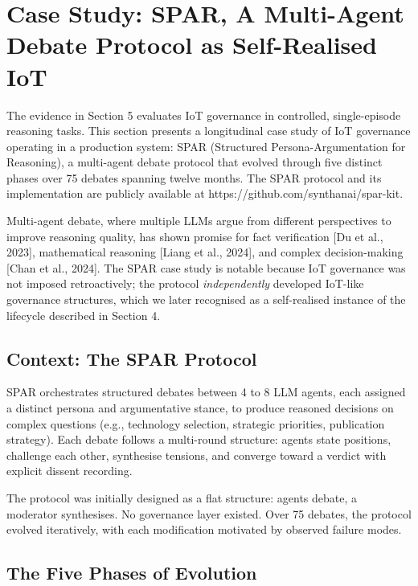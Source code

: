 \documentclass[11pt,a4paper]{article}
\begin{document}
\section{Case Study: SPAR, A Multi-Agent Debate Protocol as
Self-Realised
IoT}\label{case-study-spar-a-multi-agent-debate-protocol-as-self-realised-iot}

The evidence in Section 5 evaluates IoT governance in controlled,
single-episode reasoning tasks. This section presents a longitudinal
case study of IoT governance operating in a production system: SPAR
(Structured Persona-Argumentation for Reasoning), a multi-agent debate
protocol that evolved through five distinct phases over 75 debates
spanning twelve months. The SPAR protocol and its implementation are
publicly available at https://github.com/synthanai/spar-kit.

Multi-agent debate, where multiple LLMs argue from different
perspectives to improve reasoning quality, has shown promise for fact
verification {[}Du et al., 2023{]}, mathematical reasoning {[}Liang et
al., 2024{]}, and complex decision-making {[}Chan et al., 2024{]}. The
SPAR case study is notable because IoT governance was not imposed
retroactively; the protocol \emph{independently} developed IoT-like
governance structures, which we later recognised as a self-realised
instance of the lifecycle described in Section 4.

\subsection{Context: The SPAR Protocol}\label{context-the-spar-protocol}

SPAR orchestrates structured debates between 4 to 8 LLM agents, each
assigned a distinct persona and argumentative stance, to produce
reasoned decisions on complex questions (e.g., technology selection,
strategic priorities, publication strategy). Each debate follows a
multi-round structure: agents state positions, challenge each other,
synthesise tensions, and converge toward a verdict with explicit dissent
recording.

The protocol was initially designed as a flat structure: agents debate,
a moderator synthesises. No governance layer existed. Over 75 debates,
the protocol evolved iteratively, with each modification motivated by
observed failure modes.

\subsection{The Five Phases of
Evolution}\label{the-five-phases-of-evolution}
\end{document}
